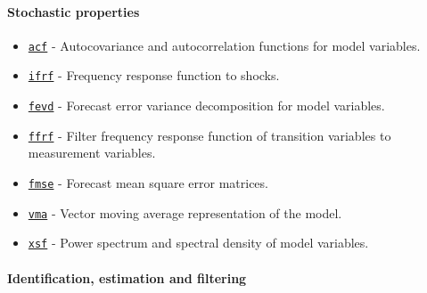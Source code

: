  \paragraph{Stochastic properties}
 
 \begin{itemize}
 \item
   \href{model/acf}{\texttt{acf}} - Autocovariance and autocorrelation
   functions for model variables.
 \item
   \href{model/ifrf}{\texttt{ifrf}} - Frequency response function to
   shocks.
 \item
   \href{model/fevd}{\texttt{fevd}} - Forecast error variance
   decomposition for model variables.
 \item
   \href{model/ffrf}{\texttt{ffrf}} - Filter frequency response function
   of transition variables to measurement variables.
 \item
   \href{model/fmse}{\texttt{fmse}} - Forecast mean square error
   matrices.
 \item
   \href{model/vma}{\texttt{vma}} - Vector moving average representation
   of the model.
 \item
   \href{model/xsf}{\texttt{xsf}} - Power spectrum and spectral density
   of model variables.
 \end{itemize}
 
 \paragraph{Identification, estimation and filtering}
 

